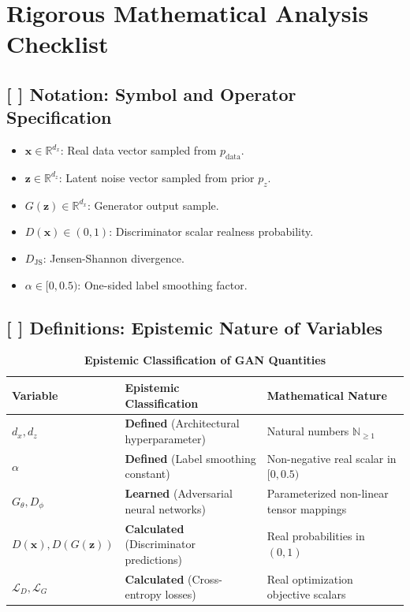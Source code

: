 \documentclass[11pt,a4paper]{article}
\theoremstyle{definition}
\begin{document}
\section{Rigorous Mathematical Analysis Checklist}

\subsection{[ ] Notation: Symbol and Operator Specification}
\begin{itemize}
    \item $\mathbf{x} \in \mathbb{R}^{d_x}$: Real data vector sampled from $p_{\text{data}}$.
    \item $\mathbf{z} \in \mathbb{R}^{d_z}$: Latent noise vector sampled from prior $p_z$.
    \item $G(\mathbf{z}) \in \mathbb{R}^{d_x}$: Generator output sample.
    \item $D(\mathbf{x}) \in (0, 1)$: Discriminator scalar realness probability.
    \item $D_{\text{JS}}$: Jensen-Shannon divergence.
    \item $\alpha \in [0, 0.5)$: One-sided label smoothing factor.
\end{itemize}

\subsection{[ ] Definitions: Epistemic Nature of Variables}
\begin{table}[h]
\centering
\caption{\textbf{Epistemic Classification of GAN Quantities}}
\begin{tabular}{lll}
\toprule
\textbf{Variable} & \textbf{Epistemic Classification} & \textbf{Mathematical Nature} \\
\midrule
$d_x, d_z$ & \textbf{Defined} (Architectural hyperparameter) & Natural numbers $\mathbb{N}_{\ge 1}$ \\
$\alpha$ & \textbf{Defined} (Label smoothing constant) & Non-negative real scalar in $[0, 0.5)$ \\
$G_\theta, D_\phi$ & \textbf{Learned} (Adversarial neural networks) & Parameterized non-linear tensor mappings \\
$D(\mathbf{x}), D(G(\mathbf{z}))$ & \textbf{Calculated} (Discriminator predictions) & Real probabilities in $(0, 1)$ \\
$\mathcal{L}_D, \mathcal{L}_G$ & \textbf{Calculated} (Cross-entropy losses) & Real optimization objective scalars \\
\bottomrule
\end{tabular}
\end{table}
\end{document}
